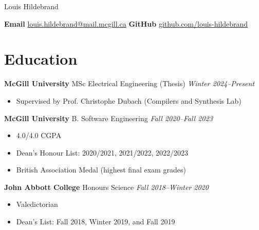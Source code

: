 \documentclass[12pt]{article}
\newenvironment{gitemize}{\begin{itemize} \color{mygrey}}{\end{itemize}}
\begin{document}

\pagestyle{empty}

\begin{center}
	\Huge
	Louis Hildebrand
\end{center}
\vspace{0.5\baselineskip}

\textbf{Email}
\href{mailto:louis.hildebrand@mail.mcgill.ca}{louis.hildebrand@mail.mcgill.ca}
\hfill
\textbf{GitHub}
\href{https://github.com/louis-hildebrand}{github.com/louis-hildebrand}

\section*{Education}

\textbf{McGill University} MSc Electrical Engineering (Thesis)
\hfill
\textit{Winter 2024--Present}
\begin{gitemize}
	\item Supervised by Prof. Christophe Dubach (Compilers and Synthesis Lab)
\end{gitemize}

\textbf{McGill University} B. Software Engineering
\hfill
\textit{Fall 2020--Fall 2023}
\begin{gitemize}
	\item 4.0/4.0 CGPA
	\item Dean's Honour List: 2020/2021, 2021/2022, 2022/2023
	\item British Association Medal (highest final exam grades)
\end{gitemize}

\textbf{John Abbott College} Honours Science
\hfill
\textit{Fall 2018--Winter 2020}
\begin{gitemize}
	\item Valedictorian
	\item Dean's List: Fall 2018, Winter 2019, and Fall 2019
\end{gitemize}


\end{document}

